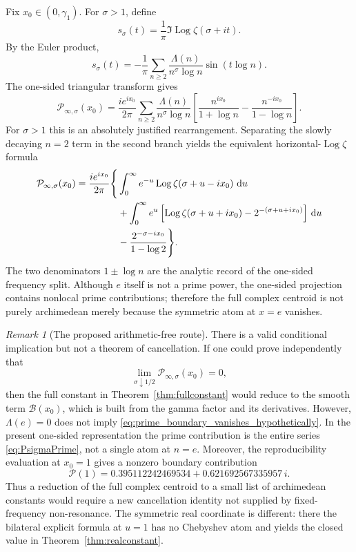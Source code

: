 \documentclass[11pt]{amsart}
\numberwithin{equation}{section}
\theoremstyle{definition}
\theoremstyle{remark}
\newtheorem{remark}[theorem]{Remark}
\newcommand{\dd}{\,\mathrm d}
\newcommand{\Log}{\operatorname{Log}}
\newcommand{\cP}{\mathcal P}
\newcommand{\cB}{\mathcal B}
\begin{document}
Fix $x_0\in(0,\gamma_1)$. For $\sigma>1$, define
\[
s_\sigma(t)=\frac1\pi\Im\Log\zeta(\sigma+it).
\]
By the Euler product,
\begin{equation}\label{eq:ssigma}
s_\sigma(t)
=-\frac1\pi\sum_{n\ge2}
\frac{\Lambda(n)}{n^\sigma\log n}\sin(t\log n).
\end{equation}
The one-sided triangular transform gives
\begin{equation}\label{eq:PsigmaPrime}
\cP_{\infty,\sigma}(x_0)
=
\frac{i e^{ix_0}}{2\pi}
\sum_{n\ge2}
\frac{\Lambda(n)}{n^\sigma\log n}
\left[
\frac{n^{ix_0}}{1+\log n}
-
\frac{n^{-ix_0}}{1-\log n}
\right].
\end{equation}
For $\sigma>1$ this is an absolutely justified rearrangement. Separating the slowly decaying $n=2$ term in the second branch yields the equivalent horizontal-$\Log\zeta$ formula
\begin{align}
\cP_{\infty,\sigma}(x_0)
=\frac{i e^{ix_0}}{2\pi}\Bigg\{&
\int_0^\infty e^{-u}\Log\zeta(\sigma+u-ix_0)\,\dd u\notag\\
&+\int_0^\infty e^u\left[
\Log\zeta(\sigma+u+ix_0)-2^{-(\sigma+u+ix_0)}
\right]\dd u\notag\\
&-\frac{2^{-\sigma-ix_0}}{1-\log2}
\Bigg\}.
\label{eq:PsigmaLogzeta}
\end{align}
The two denominators $1\pm\log n$ are the analytic record of the one-sided frequency split. Although $e$ itself is not a prime power, the one-sided projection contains nonlocal prime contributions; therefore the full complex centroid is not purely archimedean merely because the symmetric atom at $x=e$ vanishes.

\begin{remark}[The proposed arithmetic-free route]\label{rem:arithmetic_free_route}
There is a valid conditional implication but not a theorem of cancellation. If one could prove independently that
\begin{equation}\label{eq:prime_boundary_vanishes_hypothetically}
\lim_{\sigma\downarrow1/2}\cP_{\infty,\sigma}(x_0)=0,
\end{equation}
then the full constant in Theorem~\ref{thm:fullconstant} would reduce to the smooth term $\cB(x_0)$, which is built from the gamma factor and its derivatives. However, $\Lambda(e)=0$ does not imply \eqref{eq:prime_boundary_vanishes_hypothetically}. In the present one-sided representation the prime contribution is the entire series \eqref{eq:PsigmaPrime}, not a single atom at $n=e$. Moreover, the reproducibility evaluation at $x_0=1$ gives a nonzero boundary contribution
\begin{equation}\label{eq:prime_boundary_numeric}
\cP(1)=0.395112242469534+0.621692567335957\,i.
\end{equation}
Thus a reduction of the full complex centroid to a small list of archimedean constants would require a new cancellation identity not supplied by fixed-frequency non-resonance. The symmetric real coordinate is different: there the bilateral explicit formula at $u=1$ has no Chebyshev atom and yields the closed value in Theorem~\ref{thm:realconstant}.
\end{remark}
\end{document}
